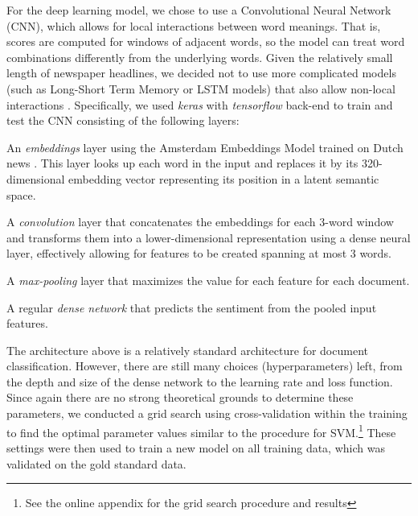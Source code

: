 For the deep learning model, we chose to use a Convolutional Neural Network (CNN), 
which allows for local interactions between word meanings.
That is, scores are computed for windows of adjacent words, so the model can treat word combinations differently from the underlying words. 
Given the relatively small length of newspaper headlines, we decided not to use more complicated models (such as Long-Short Term Memory or LSTM models) that also allow non-local interactions \citep{goldberg17}.
Specifically, we used \emph{keras} with \emph{tensorflow} back-end \citep{tensorflow} to train and test the CNN consisting of the following layers:
\begin{APAenumerate}%
    \item An \emph{embeddings} layer using the Amsterdam Embeddings Model trained on Dutch news \citep{aem}. This layer looks up each word in the input and replaces it by its 320-dimensional embedding vector representing its position in a latent semantic space.
    \item A \emph{convolution} layer that concatenates the embeddings for each 3-word window and transforms them into a lower-dimensional representation using a dense neural layer, effectively allowing for features to be created spanning at most 3 words.
    \item A \emph{max-pooling} layer that maximizes the value for each feature for each document.
    \item A regular \emph{dense network} that predicts the sentiment from the pooled input features. 
\end{APAenumerate}

The architecture above is a relatively standard architecture for document classification. 
However, there are still many choices (hyperparameters) left, from the depth and size of the dense network to the learning rate and loss function. 
Since again there are no strong theoretical grounds to determine these parameters, we conducted a grid search using cross-validation within the training to find the optimal parameter values similar to the procedure for SVM.\footnote{See the online appendix for the grid search procedure and results}
These settings were then used to train a new model on all training data, which was validated on the gold standard data. 


